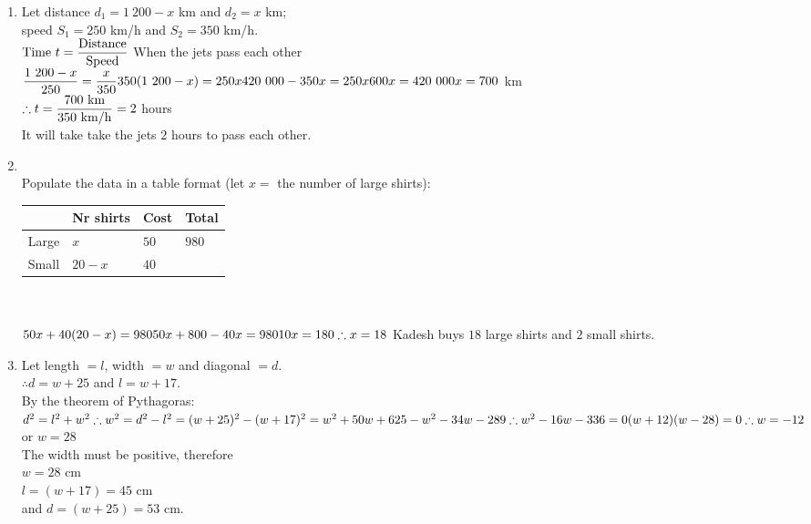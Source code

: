  \begin{solutions}{}{
\begin{enumerate}[itemsep=10pt, label=\textbf{\arabic*}. ] 


\item Let distance $d_1=1~200-x$ km and $d_2=x$ km; \\
speed $S_1=250$ km/h and $S_2=350$ km/h. \\
$\mbox{Time } t = \dfrac{\mbox{Distance}}{\mbox{Speed}} \\[5pt]$
When the jets pass each other $\dfrac{1~200-x}{250} = \dfrac{x}{350}\\[5pt]
350(1~200-x)=250x\\
420~000 - 350x = 250x\\
600x = 420~000\\
x= 700$ km\\[5pt]

$\therefore t=\dfrac{700\mbox{ km}}{350{\mbox{ km/h}}}\\[5pt]
=2$ hours\\
It will take take the jets $2$ hours to pass each other.

\item\\
Populate the data in a table format (let $x=$ the number of large shirts):\\
  \begin{tabularx}{8cm}{ |X|X|X|X| }\hline
& Nr shirts & Cost & Total \\ \hline
Large & $x$ & $50$ & $980$\\ \hline
Small & $20-x$ & $40$&\\ \hline
\end{tabularx}\\
\\
$50x+40(20-x)=980\\
50x+800-40x=980\\
10x=180\\
\therefore x=18\\$
Kadesh buys $18$ large shirts and $2$ small shirts.

\item Let length $=l$, width $=w$ and diagonal $=d$.\\
$\therefore d=w+25$ and $l=w+17$.\\
By the theorem of Pythagoras:\\
$d^2 = l^2+w^2\\
\therefore w^2 = d^2-l^2\\
=(w+25)^2 - (w+17)^2\\
=w^2+50w+625-w^2-34w-289\\
\therefore w^2 - 16w - 336 = 0\\
(w+12)(w-28)=0\\
\therefore w= -12$ or $w=28$\\
The width must be positive, therefore \\
$w=28$ cm\\ 
$l=(w+17)=45$ cm \\
and $d=(w+25)=53$ cm.



\end{enumerate}}
\end{solutions}
